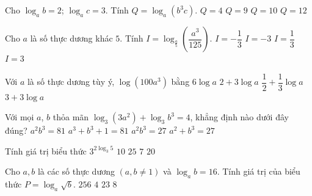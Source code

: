 \begin{ex}%
	Cho $\log_{a}b=2$;  $\log_{a}c=3$. Tính $Q=\log_{a}\left(b^{3}c\right)$.
	\choice 
		{$Q=4$} 
		{\True $Q=9$} 
		 {$Q=10$}
		 {$Q=12$}
\end{ex}

\begin{ex}%
	Cho  $a$ là số thực dương khác $5$. Tính $I=\log_{\tfrac{a}{5}}\left(\dfrac{a^{3}}{125}\right)$.
	\choice 
		 {$I=-\dfrac{1}{3}$}
		{$I=-3$} 
		 {$I=\dfrac{1}{3}$}
		 {\True $I=3$}
\end{ex}

\begin{ex}%
	Với $a$ là số  thực dương tùy ý, $\log\left(100a^3\right)$ bằng
	\choice 
		 {$6\log a$}
		{\True $2+3\log a$} 
		 {$\dfrac{1}{2}+\dfrac{1}{3}\log a$}
		{$3+3\log  a$}
\end{ex}

\begin{ex}%
	Với mọi $a$, $b$ thỏa mãn  $\log_3\left(3a^2\right)+\log_3b^3=4$, khẳng định nào dưới đây đúng?
	\choice 
		 {$a^2b^3=81$}
		 {$a^3+b^3+1=81$}
		{\True $a^2b^3=27$} 
		 {$a^2+b^3=27$}
\end{ex}

\begin{ex}%
	Tính giá trị  biểu thức $3^{2\log_3 5}$
	 \choice
		{$10$} 
		 {\True $25$}
		 {$7$}
		 {$20$}
\end{ex}

\begin{ex}%
	Cho $a,b$ là  các số thực dương $\left(a,b\ne1\right)$ và $\log_{a}b=16$. Tính giá trị của biểu thức $P=\log_{a}\sqrt{b}$.
	\choice 
		{$256$} 
		{$4$} 
		 {$23$}
		{\True $8$} 
\end{ex}

